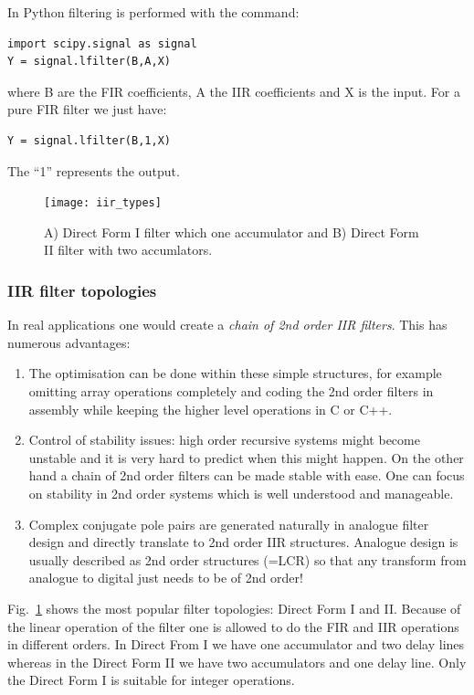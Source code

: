 \documentclass[12pt,a4paper]{article}
\begin{document}
In Python filtering is performed with the command:
\begin{verbatim}
import scipy.signal as signal
Y = signal.lfilter(B,A,X)
\end{verbatim}
where B are the FIR coefficients, A the IIR coefficients and X is the input.
For a pure FIR filter we just have:
\begin{verbatim}
Y = signal.lfilter(B,1,X)
\end{verbatim}
The ``1'' represents the output.


\begin{figure}[!hbt]
\begin{center}
\mbox{\texttt{[image: iir\_types]}}
\end{center}
\caption{A) Direct Form I filter which one accumulator and
  B) Direct Form II filter with two accumlators.
\label{iir_types}}
\end{figure}


\subsubsection{IIR filter topologies}
In real applications one would create a \textsl{chain of 2nd order
IIR filters}. This has numerous advantages:
\begin{enumerate}
\item The optimisation can be done within these simple structures,
  for example omitting array operations completely and coding
  the 2nd order filters in assembly while keeping the higher
  level operations in C or C++.
\item Control of stability issues: high order recursive
  systems might become unstable and it is very hard to predict
  when this might happen. On the other hand a chain of 2nd order
  filters can be made stable with ease. One can focus on
  stability in 2nd order systems which is well understood and
  manageable.
\item Complex conjugate pole pairs are generated naturally
  in analogue filter design and directly translate to 2nd
  order IIR structures. Analogue design is usually described
  as 2nd order structures (=LCR) so that any transform from analogue
  to digital just needs to be of 2nd order!
\end{enumerate}

Fig.~\ref{iir_types} shows the most popular filter topologies:
Direct Form I and II. Because of the linear operation of the filter
one is allowed to do the FIR and IIR operations in different orders.
In Direct From I we have one accumulator and two delay lines whereas
in the Direct Form II we have two accumulators and one delay line.
Only the Direct Form I is suitable for integer operations.
\end{document}
